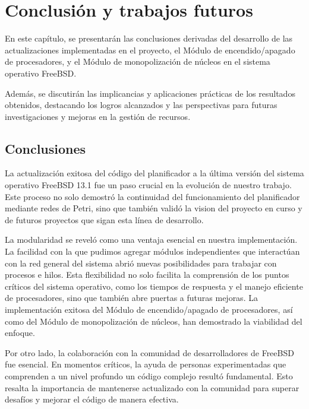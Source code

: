 \section{Conclusión y trabajos futuros}

En este capítulo, se presentarán las conclusiones derivadas del desarrollo de las actualizaciones implementadas en el proyecto, el Módulo de encendido/apagado de procesadores, y el Módulo de monopolización de núcleos en el sistema operativo FreeBSD.\par

Además, se discutirán las implicancias y aplicaciones prácticas de los resultados obtenidos, destacando los logros alcanzados y las perspectivas para futuras investigaciones y mejoras en la gestión de recursos.\par

\subsection{Conclusiones}
La actualización exitosa del código del planificador a la última versión del sistema operativo FreeBSD 13.1 fue un paso crucial en la evolución de nuestro trabajo.  Este proceso no solo demostró la continuidad del funcionamiento del planificador mediante redes de Petri, sino que también validó la vision del proyecto en curso y de futuros proyectos que sigan esta línea de desarrollo.\par

La modularidad se reveló como una ventaja esencial en nuestra implementación. La facilidad con la que pudimos agregar módulos independientes que interactúan con la red general del sistema abrió nuevas posibilidades para trabajar con procesos e hilos. Esta flexibilidad no solo facilita la comprensión de los puntos críticos del sistema operativo, como los tiempos de respuesta y el manejo eficiente de procesadores, sino que también abre puertas a futuras mejoras. La implementación exitosa del Módulo de encendido/apagado de procesadores, así como del Módulo de monopolización de núcleos, han demostrado la viabilidad del enfoque.\par

Por otro lado, la colaboración con la comunidad de desarrolladores de FreeBSD fue esencial. En momentos críticos, la ayuda de personas experimentadas que comprenden a un nivel profundo un código complejo resultó fundamental. Esto resalta la importancia de mantenerse actualizado con la comunidad para superar desafíos y mejorar el código de manera efectiva.\par

